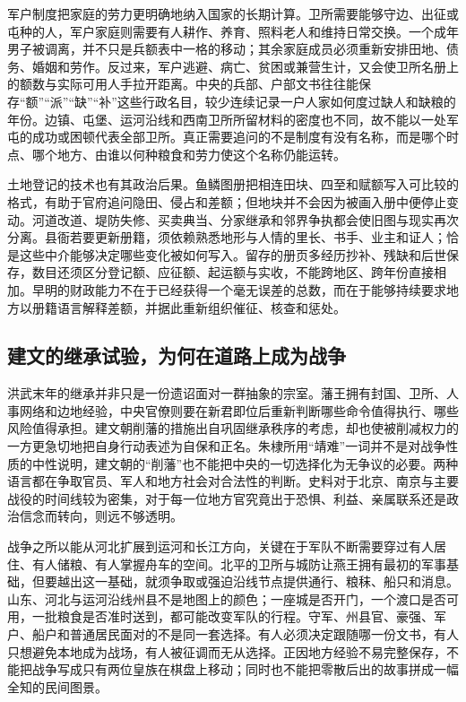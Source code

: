 军户制度把家庭的劳力更明确地纳入国家的长期计算。卫所需要能够守边、出征或屯种的人，军户家庭则需要有人耕作、养育、照料老人和维持日常交换。一个成年男子被调离，并不只是兵额表中一格的移动；其余家庭成员必须重新安排田地、债务、婚姻和劳作。反过来，军户逃避、病亡、贫困或兼营生计，又会使卫所名册上的额数与实际可用人手拉开距离。中央的兵部、户部文书往往能保存“额”“派”“缺”“补”这些行政名目，较少连续记录一户人家如何度过缺人和缺粮的年份。边镇、屯堡、运河沿线和西南卫所所留材料的密度也不同，故不能以一处军屯的成功或困顿代表全部卫所。真正需要追问的不是制度有没有名称，而是哪个时点、哪个地方、由谁以何种粮食和劳力使这个名称仍能运转。

土地登记的技术也有其政治后果。鱼鳞图册把相连田块、四至和赋额写入可比较的格式，有助于官府追问隐田、侵占和差额；但地块并不会因为被画入册中便停止变动。河道改道、堤防失修、买卖典当、分家继承和邻界争执都会使旧图与现实再次分离。县衙若要更新册籍，须依赖熟悉地形与人情的里长、书手、业主和证人；恰是这些中介能够决定哪些变化被如何写入。留存的册页多经历抄补、残缺和后世保存，数目还须区分登记额、应征额、起运额与实收，不能跨地区、跨年份直接相加。早明的财政能力不在于已经获得一个毫无误差的总数，而在于能够持续要求地方以册籍语言解释差额，并据此重新组织催征、核查和惩处。

\subsection{建文的继承试验，为何在道路上成为战争}

洪武末年的继承并非只是一份遗诏面对一群抽象的宗室。藩王拥有封国、卫所、人事网络和边地经验，中央官僚则要在新君即位后重新判断哪些命令值得执行、哪些风险值得承担。建文朝削藩的措施出自巩固继承秩序的考虑，却也使被削减权力的一方更急切地把自身行动表述为自保和正名。朱棣所用“靖难”一词并不是对战争性质的中性说明，建文朝的“削藩”也不能把中央的一切选择化为无争议的必要。两种语言都在争取官员、军人和地方社会对合法性的判断。史料对于北京、南京与主要战役的时间线较为密集，对于每一位地方官究竟出于恐惧、利益、亲属联系还是政治信念而转向，则远不够透明。

战争之所以能从河北扩展到运河和长江方向，关键在于军队不断需要穿过有人居住、有人储粮、有人掌握舟车的空间。北平的卫所与城防让燕王拥有最初的军事基础，但要越出这一基础，就须争取或强迫沿线节点提供通行、粮秣、船只和消息。山东、河北与运河沿线州县不是地图上的颜色；一座城是否开门，一个渡口是否可用，一批粮食是否准时送到，都可能改变军队的行程。守军、州县官、豪强、军户、船户和普通居民面对的不是同一套选择。有人必须决定跟随哪一份文书，有人只想避免本地成为战场，有人被征调而无从选择。正因地方经验不易完整保存，不能把战争写成只有两位皇族在棋盘上移动；同时也不能把零散后出的故事拼成一幅全知的民间图景。


